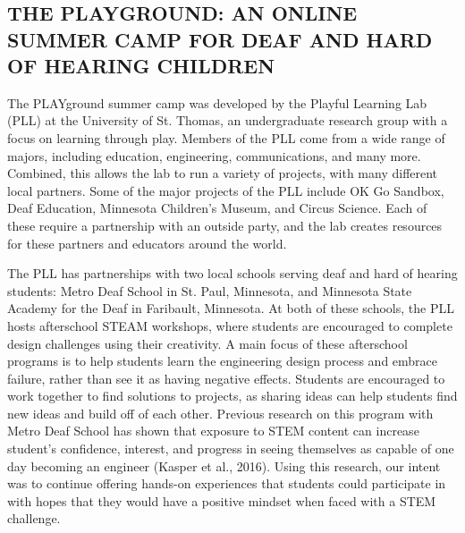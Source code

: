 \documentclass[11.5pt]{sig-alternate}
\begin{document}
\section*{\vspace{140mm}}
\begin{large}
    \section*{THE PLAYGROUND: AN ONLINE SUMMER CAMP FOR DEAF AND HARD OF HEARING CHILDREN}

The PLAYground summer camp was developed by the Playful Learning Lab (PLL) at the University of St. Thomas, an undergraduate research group with a focus on learning through play. Members of the PLL come from a wide range of majors, including education, engineering, communications, and many more. Combined, this allows the lab to run a variety of projects, with many different local partners. Some of the major projects of the PLL include OK Go Sandbox, Deaf Education, Minnesota Children’s Museum, and Circus Science. Each of these require a partnership with an outside party, and the lab creates resources for these partners and educators around the world. 

The PLL has partnerships with two local schools serving deaf and hard of hearing students: Metro Deaf School in St. Paul, Minnesota, and Minnesota State Academy for the Deaf in Faribault, Minnesota. At both of these schools, the PLL hosts afterschool STEAM workshops, where students are encouraged to complete design challenges using their creativity. A main focus of these afterschool programs is to help students learn the engineering design process and embrace failure, rather than see it as having negative effects. Students are encouraged to work together to find solutions to projects, as sharing ideas can help students find new ideas and build off of each other. Previous research on this program with Metro Deaf School has shown that exposure to STEM content can increase student’s confidence, interest, and progress in seeing themselves as capable of one day becoming an engineer (Kasper et al., 2016). Using this research, our intent was to continue offering hands-on experiences that students could participate in with hopes that they would have a positive mindset when faced with a STEM challenge. 


\end{large}
\end{document}
